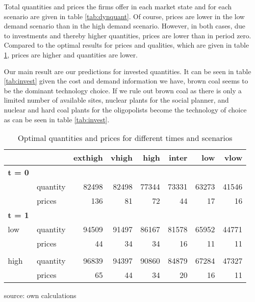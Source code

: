 Total quantities and prices the firms offer in each market state and for each scenario are given in table \ref{tab:dynquant}. Of course, prices are lower in the low demand scenario than in the high demand scenario. However, in both cases, due to investments and thereby higher quantities, prices are lower than in period zero.
Compared to the optimal results for prices and qualities, which are given in table \ref{tab:dynquantopt}, prices are higher and quantities are lower.

Our main result are our predictions for invested quantities. It can be seen in table \ref{tab:invest} given the cost and demand information we have, brown coal seems to be the dominant technology choice. If we rule out brown coal as there is only a limited number of available sites, nuclear plants for the social planner, and nuclear and hard coal plants for the oligopolists become the technology of choice as can be seen in table \ref{tab:invest}.

\begin{table}
\centering
\caption{Optimal quantities and prices for different times and scenarios}
\begin{tabular}{llrrrrrr}
\hline
\hline
           &            &    exthigh &      vhigh &       high &      inter &        low &       vlow \\
\hline
{\bf t = 0} &            &            &            &            &            &            &            \\
\hline
           &   quantity &      82498 &      82498 &      77344 &      73331 &      63273 &      41546 \\

           &     prices &        136 &         81 &         72 &         44 &         17 &         16 \\
\hline
{\bf t = 1} &            &            &            &            &            &            &            \\
\hline
       low &   quantity &      94509 &      91497 &      86167 &      81578 &      65952 &      44771 \\

           &     prices &         44 &         34 &         34 &         16 &         11 &         11 \\

           &            &            &            &            &            &            &            \\

      high &   quantity &      96839 &      94397 &      90860 &      84879 &      67284 &      47327 \\

           &     prices &         65 &         44 &         34 &         20 &         16 &         11 \\
\hline
\hline
\end{tabular}  
 
\label{tab:dynquantopt}
\begin{center}
source: own calculations
\end{center}
\end{table}

